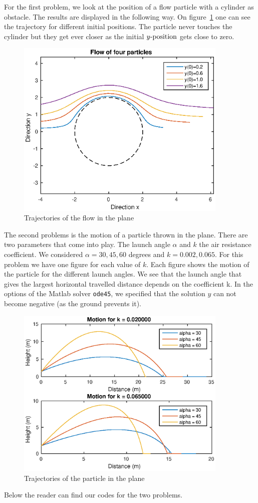 For the first problem, we look at the position of a flow particle with a cylinder as obstacle. The results are displayed in the following way. On figure~\ref{fig:c1} one can see the trajectory for different initial positions. The particle never touches the cylinder but they get ever closer as the initial $y\text{-position}$ gets close to zero.

\begin{figure}[!h]
\centering
\includegraphics[width = 0.9\textwidth]{./c1.eps}
\caption{Trajectories of the flow in the plane}
\label{fig:c1}
\end{figure}

The second problems is the motion of a particle thrown in the plane. There are two parameters that come into play. The launch angle $\alpha$ and $k$ the air resistance coefficient. We considered $\alpha= 30, 45, 60$ degrees and $k=0.002, 0.065$. For this problem we have one figure for each value of $k$. Each figure shows the motion of the particle for the different launch angles. We see that the launch angle that gives the largest horizontal travelled distance depends on the coefficient k. In the options of the Matlab solver \texttt{ode45}, we specified that the solution $y$ can not become negative (as the ground prevents it).


\begin{figure}[!h]
\centering
\includegraphics[width = 0.9\textwidth]{./c2.eps}
\caption{Trajectories of the particle in the plane}
\label{fig:c2}
\end{figure}
\FloatBarrier
Below the reader can find our codes for the two problems.



